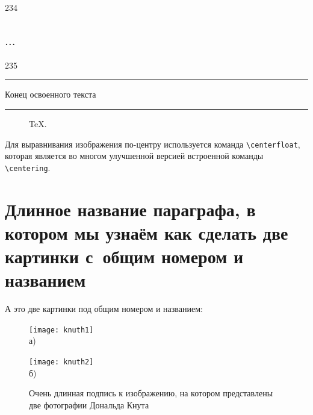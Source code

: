 234



\subsection{$\ldots$}\label{subsec:ch2/sec3/sub5}

235


















\vfill
\noindent\rule{\textwidth}{.1pt}
\begin{center}				Конец освоенного текста					\end{center}
\noindent\rule{\textwidth}{1pt}
\newpage
\newpage



\begin{figure}[ht]
    \caption{TeX.}\label{fig:latex}
\end{figure}

Для выравнивания изображения по-центру используется команда \verb+\centerfloat+, которая является во
многом улучшенной версией встроенной команды \verb+\centering+.

\section{Длинное название параграфа, в котором мы узнаём как сделать две картинки с~общим номером и названием}\label{sec:ch2/sect2}

А это две картинки под общим номером и названием:
\begin{figure}[ht]
    \begin{minipage}[b][][b]{0.49\linewidth}\centering
        \texttt{[image: knuth1]} \\ а)
    \end{minipage}
    \hfill
    \begin{minipage}[b][][b]{0.49\linewidth}\centering
        \texttt{[image: knuth2]} \\ б)
    \end{minipage}
    \caption{Очень длинная подпись к изображению,
        на котором представлены две фотографии Дональда Кнута}
    \label{fig:knuth}
\end{figure}

